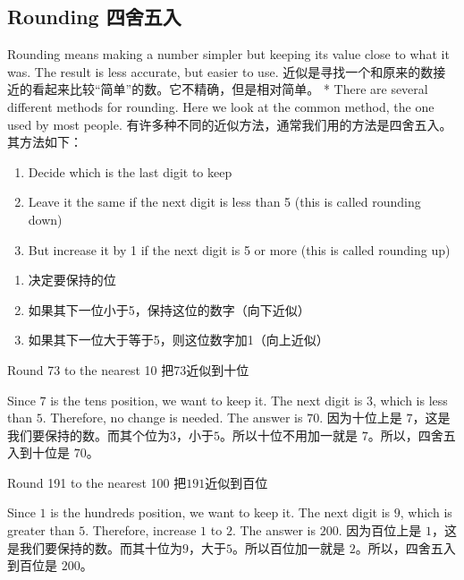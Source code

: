 \subsection{Rounding 四舍五入}
\begin{paracol}{2}
Rounding means making a number simpler but keeping its value close to what it was. The result is less accurate, but easier to use. 
\switchcolumn[1]
近似是寻找一个和原来的数接近的看起来比较“简单”的数。它不精确，但是相对简单。
\switchcolumn[0]*
There are several different methods for rounding. Here we look at the common method, the one used by most people.
\switchcolumn[1]
有许多种不同的近似方法，通常我们用的方法是四舍五入。其方法如下：
\end{paracol}

\begin{newalg}
\begin{enumerate}
\item Decide which is the last digit to keep
\item Leave it the same if the next digit is less than 5 (this is called rounding down)
\item But increase it by 1 if the next digit is 5 or more (this is called rounding up)
\end{enumerate}

\begin{enumerate}
\item 决定要保持的位
\item  如果其下一位小于5，保持这位的数字（向下近似）
\item  如果其下一位大于等于5，则这位数字加1（向上近似）
\end{enumerate}
\end{newalg}

\begin{example}
Round 73 to the nearest 10 把73近似到十位
\end{example}
\begin{solution}
\begin{paracol}{2}
Since $7$ is the tens position, we want to keep it. The next digit is $3$, which is less than $5$. Therefore, no change is needed. The answer is $70$.
\switchcolumn[1]
因为十位上是 $7$，这是我们要保持的数。而其个位为$3$，小于$5$。所以十位不用加一就是 $7$。所以，四舍五入到十位是 $70$。
\end{paracol}
\end{solution}

\begin{example}
Round 191 to the nearest 100 把$191$近似到百位
\end{example}
\begin{solution}
\begin{paracol}{2}
Since $1$ is the hundreds position, we want to keep it. The next digit is $9$, which is greater than $5$. Therefore, increase $1$ to $2$. The answer is $200$.
\switchcolumn[1]
因为百位上是 $1$，这是我们要保持的数。而其十位为$9$，大于$5$。所以百位加一就是 $2$。所以，四舍五入到百位是 $200$。
\end{paracol}
\end{solution}
\newpage